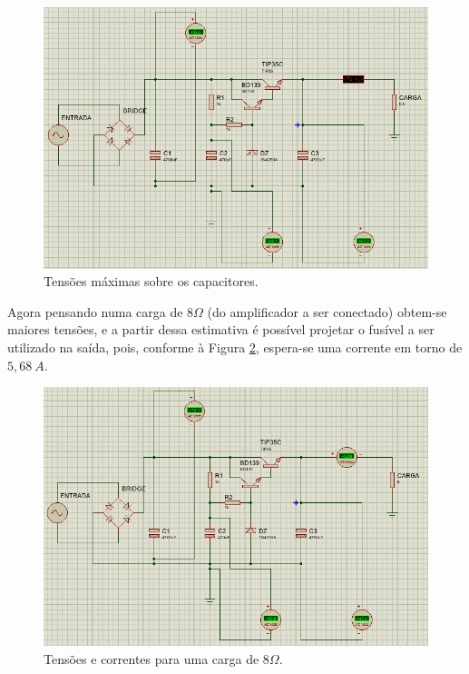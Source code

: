 \documentclass[a4paper,12pt,oneside,openany,table,xcdraw]{article}
\begin{document}
\begin{figure}[H]
\centering
\captionsetup{font=scriptsize}
\includegraphics[width=15cm]{sim2}
\caption{Tensões máximas sobre os capacitores.}
\label{sim2}
\end{figure}

Agora pensando numa carga de $8 \Omega$ (do amplificador a ser conectado) obtem-se maiores tensões, e a partir dessa estimativa é possível projetar o fusível a ser utilizado na saída, pois, conforme à Figura \ref{com-carga}, espera-se uma corrente em torno de $5,68\ A$.

\begin{figure}[H]
\centering
\captionsetup{font=scriptsize}
\includegraphics[width=15cm]{com-carga}
\caption{Tensões e correntes para uma carga de $8\Omega$.}
\label{com-carga}
\end{figure}
\end{document}
